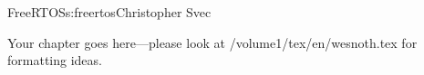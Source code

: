 \begin{aosachapter}{FreeRTOS}{s:freertos}{Christopher Svec}

Your chapter goes here---please look at /volume1/tex/en/wesnoth.tex for 
formatting ideas.

\end{aosachapter}
